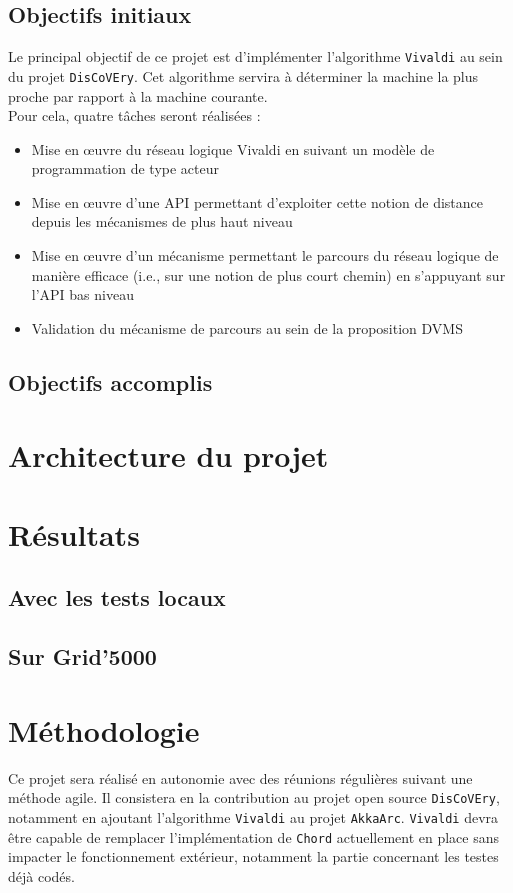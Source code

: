 \documentclass[11pt,a4paper]{article}
\begin{document}
\subsection{Objectifs initiaux}
Le principal objectif de ce projet est d'implémenter l'algorithme \texttt{Vivaldi} au sein du projet \texttt{DisCoVEry}. Cet algorithme servira à déterminer la machine la plus proche par rapport à la machine courante.\\

Pour cela, quatre tâches seront réalisées :
\begin{itemize}
\item Mise en \oe uvre du réseau logique Vivaldi en suivant un modèle de programmation de type acteur
\item Mise en \oe uvre d’une API permettant d’exploiter cette notion de distance
depuis les mécanismes de plus haut niveau
\item Mise en \oe uvre d’un mécanisme permettant le parcours du réseau logique de manière efficace (i.e., sur une notion de plus court chemin) en s’appuyant sur l’API bas niveau
\item Validation du mécanisme de parcours au sein de la proposition DVMS
\end{itemize}

\subsection{Objectifs accomplis}

\section{Architecture du projet}

\section{Résultats}

\subsection{Avec les tests locaux}

\subsection{Sur Grid'5000}

\section{Méthodologie}
Ce projet sera réalisé en autonomie avec des réunions régulières suivant une méthode agile. Il consistera en la contribution au projet open source \texttt{DisCoVEry}, notamment en ajoutant l'algorithme \texttt{Vivaldi} au projet \texttt{AkkaArc}. \texttt{Vivaldi} devra être capable de remplacer l'implémentation de \texttt{Chord} actuellement en place sans impacter le fonctionnement extérieur, notamment la partie concernant les testes déjà codés.
\end{document}
